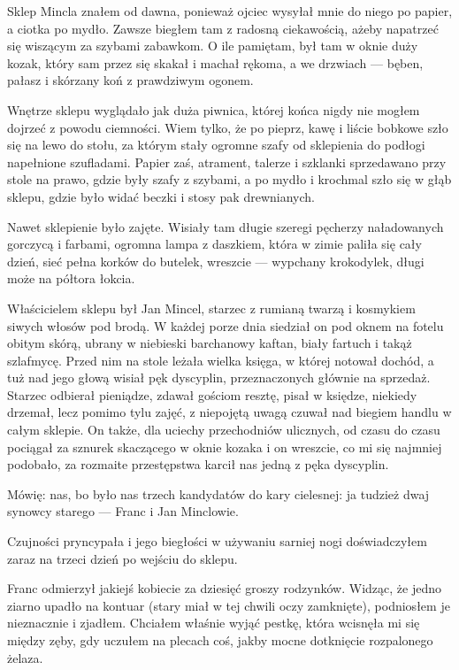 \documentclass{book}
\begin{document}
Sklep Mincla znałem od dawna, ponieważ ojciec wysyłał mnie do niego po papier, a ciotka po mydło. Zawsze biegłem tam z radosną ciekawością, ażeby napatrzeć się wiszącym za szybami zabawkom. O ile pamiętam, był tam w oknie duży kozak, który sam przez się skakał i machał rękoma, a we drzwiach — bęben, pałasz i skórzany koń z prawdziwym ogonem.

Wnętrze sklepu wyglądało jak duża piwnica, której końca nigdy nie mogłem dojrzeć z powodu ciemności. Wiem tylko, że po pieprz, kawę i liście bobkowe szło się na lewo do stołu, za którym stały ogromne szafy od sklepienia do podłogi napełnione szufladami. Papier zaś, atrament, talerze i szklanki sprzedawano przy stole na prawo, gdzie były szafy z szybami, a po mydło i krochmal szło się w głąb sklepu, gdzie było widać beczki i stosy pak drewnianych.

Nawet sklepienie było zajęte. Wisiały tam długie szeregi pęcherzy naładowanych gorczycą i farbami, ogromna lampa z daszkiem, która w zimie paliła się cały dzień, sieć pełna korków do butelek, wreszcie — wypchany krokodylek, długi może na półtora łokcia.

Właścicielem sklepu był Jan Mincel, starzec z rumianą twarzą i kosmykiem siwych włosów pod brodą. W każdej porze dnia siedział on pod oknem na fotelu obitym skórą, ubrany w niebieski barchanowy kaftan, biały fartuch i takąż szlafmycę. Przed nim na stole leżała wielka księga, w której notował dochód, a tuż nad jego głową wisiał pęk dyscyplin, przeznaczonych głównie na sprzedaż. Starzec odbierał pieniądze, zdawał gościom resztę, pisał w księdze, niekiedy drzemał, lecz pomimo tylu zajęć, z niepojętą uwagą czuwał nad biegiem handlu w całym sklepie. On także, dla uciechy przechodniów ulicznych, od czasu do czasu pociągał za sznurek skaczącego w oknie kozaka i on wreszcie, co mi się najmniej podobało, za rozmaite przestępstwa karcił nas jedną z pęka dyscyplin.

Mówię: nas, bo było nas trzech kandydatów do kary cielesnej: ja tudzież dwaj synowcy starego — Franc i Jan Minclowie.

Czujności pryncypała i jego biegłości w używaniu sarniej nogi doświadczyłem zaraz na trzeci dzień po wejściu do sklepu.

Franc odmierzył jakiejś kobiecie za dziesięć groszy rodzynków. Widząc, że jedno ziarno upadło na kontuar (stary miał w tej chwili oczy zamknięte), podniosłem je nieznacznie i zjadłem. Chciałem właśnie wyjąć pestkę, która wcisnęła mi się między zęby, gdy uczułem na plecach coś, jakby mocne dotknięcie rozpalonego żelaza.
\end{document}
